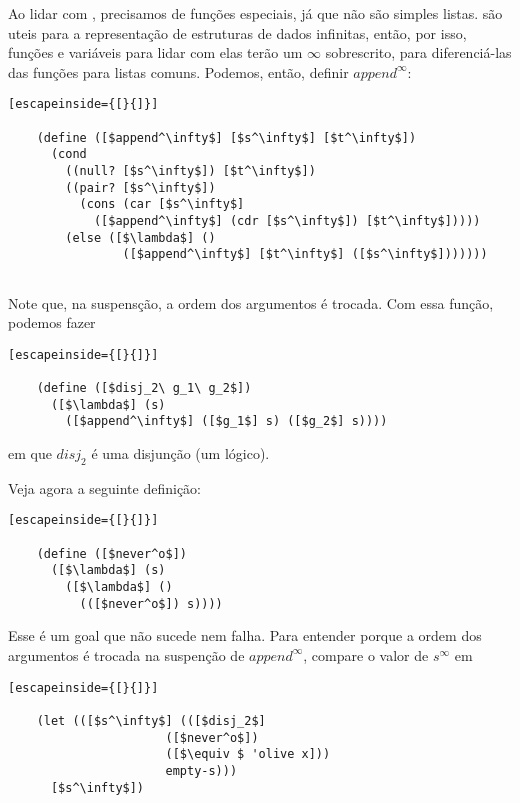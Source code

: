 \documentclass{article}
\begin{document}
  Ao lidar com , precisamos de funções especiais,
  já que não são simples listas.  são uteis para a
  representação de estruturas de dados infinitas, então, por isso,
  funções e variáveis para lidar com elas terão um $\infty$ sobrescrito,
  para diferenciá-las das funções para listas comuns. Podemos, então,
  definir $append^\infty$:

  \begin{lstlisting}[escapeinside={[}{]}]

    (define ([$append^\infty$] [$s^\infty$] [$t^\infty$])
      (cond
        ((null? [$s^\infty$]) [$t^\infty$])
        ((pair? [$s^\infty$])
          (cons (car [$s^\infty$]
            ([$append^\infty$] (cdr [$s^\infty$]) [$t^\infty$]))))
        (else ([$\lambda$] ()
                ([$append^\infty$] [$t^\infty$] ([$s^\infty$]))))))
        
  \end{lstlisting}

  \noindent Note que, na suspensção, a ordem dos argumentos é trocada.
  Com essa função, podemos fazer

  \begin{lstlisting}[escapeinside={[}{]}]

    (define ([$disj_2\ g_1\ g_2$])
      ([$\lambda$] (s)
        ([$append^\infty$] ([$g_1$] s) ([$g_2$] s))))

  \end{lstlisting}
      
  \noindent em que $disj_2$ é uma disjunção (um 
  lógico). 

  Veja agora a seguinte definição:

  \begin{lstlisting}[escapeinside={[}{]}]

    (define ([$never^o$])
      ([$\lambda$] (s)
        ([$\lambda$] ()
          (([$never^o$]) s))))

  \end{lstlisting}

  \noindent Esse é um goal que não sucede nem falha. Para entender
  porque a ordem dos argumentos é trocada na suspenção de $append^\infty$,
  compare o valor de $s^\infty$ em

  \begin{lstlisting}[escapeinside={[}{]}]

    (let (([$s^\infty$] (([$disj_2$]
                      ([$never^o$])
                      ([$\equiv $ 'olive x]))
                      empty-s)))
      [$s^\infty$])
                      
  \end{lstlisting}
\end{document}
